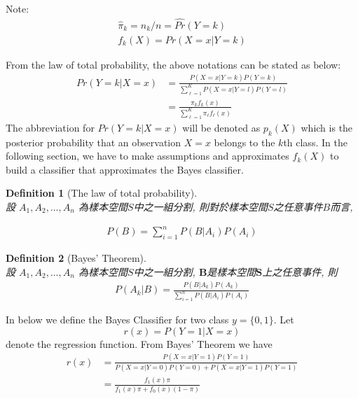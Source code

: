 \documentclass[12pt,a4paper]{article}%
\newtheorem{definition}{Definition}
\theoremstyle{definition}
\theoremstyle{plain}
\numberwithin{equation}{section}
\begin{document}
\begin{framed}
Note:
\begin{gather*}
\hat{\pi}_{k} = n_{k}/n = \hat{Pr}(Y=k) \\
f_{k}(X) = Pr(X=x|Y=k)
\end{gather*}
\end{framed}
From the law of total probability, the above notations can be stated as below:
\begin{align*}
Pr(Y=k|X=x) &= \frac{P(X=x|Y=k)P(Y=k)}{\sum\limits_{\ell=1}^{K} P(X=x|Y=l)P(Y=l)} \\
  	        &= \frac{\pi_{k}f_{k}(x)}{\sum\limits_{\ell=1}^{K}\pi_{\ell}f_{\ell}(x)}
\label{lda}
\end{align*}
The abbreviation for $Pr(Y=k|X=x)$ will be denoted as $p_{k}(X)$ which is the posterior probability that an observation $X=x$ belongs to the $k$th class.
In the following section, we have to make assumptions and approximates $f_{k}(X)$ to build a classifier that approximates the Bayes classifier.

\begin{framed}
\begin{CJK}{UTF8}{cwmb}
\begin{definition}[The law of total probability]
~\\
設 $A_{1},A_{2},\dots,A_{n}$ 為樣本空間$S$中之一組分割, 則對於樣本空間$S$之任意事件$B$而言,

\begin{gather*}
P(B) = \sum\limits_{i=1}^{n}P(B|A_{i})P(A_{i})
\end{gather*}
\end{definition}
\end{CJK}
\end{framed}

\begin{framed}
\begin{CJK}{UTF8}{cwmb}
\begin{definition}[Bayes' Theorem]
~\\
設 $A_{1},A_{2},\dots,A_{n}$ 為樣本空間$S$中之一組分割, $\mathbf{B}$是樣本空間$\mathbf{S}$上之任意事件, 則
\begin{gather*}
P(A_{k}|B) = \frac{P(B|A_{k})P(A_{k})}{\sum\limits_{i=1}^{n}P(B|A_{i})P(A_{i})}
\end{gather*}
\end{definition}
\end{CJK}
\end{framed}
In below we define the Bayes Classifier for two class $y=\{0,1\}$. Let 
\begin{equation}
r(x) = P(Y=1|X=x)
\end{equation}
denote the regression function. From Bayes' Theorem we have
\begin{align*}
r(x) &= \frac{P(X=x|Y=1)P(Y=1)}{P(X=x|Y=0)P(Y=0)+P(X=x|Y=1)P(Y=1)} \\
	 &= \frac{f_{1}(x)\pi}{f_{1}(x)\pi + f_{0}(x)(1-\pi)}
\end{align*}
\end{document}
